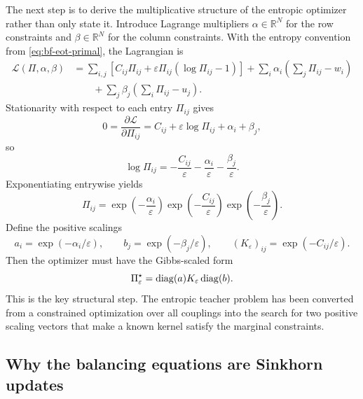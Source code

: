 The next step is to derive the multiplicative structure of the entropic optimizer
rather than only state it.  Introduce Lagrange multipliers \(\alpha\in\mathbb R^N\)
for the row constraints and \(\beta\in\mathbb R^N\) for the column constraints.
With the entropy convention from \eqref{eq:bf-eot-primal}, the Lagrangian is
\begin{align}
\label{eq:bf-eot-lagrangian}
  \mathcal L(\Pi,\alpha,\beta)
  &=
  \sum_{i,j}
  \left[
    C_{ij}\Pi_{ij}
    + \varepsilon \Pi_{ij}(\log\Pi_{ij}-1)
  \right]
  + \sum_i \alpha_i\left(\sum_j\Pi_{ij}-w_i\right) \\
  &\qquad
  + \sum_j \beta_j\left(\sum_i\Pi_{ij}-u_j\right).
\end{align}
Stationarity with respect to each entry \(\Pi_{ij}\) gives
\begin{equation}
\label{eq:bf-eot-stationarity}
  0
  =
  \frac{\partial \mathcal L}{\partial \Pi_{ij}}
  =
  C_{ij}
  + \varepsilon \log \Pi_{ij}
  + \alpha_i + \beta_j,
\end{equation}
so
\begin{equation}
\label{eq:bf-eot-log-pi}
  \log\Pi_{ij}
  =
  -\frac{C_{ij}}{\varepsilon}
  -\frac{\alpha_i}{\varepsilon}
  -\frac{\beta_j}{\varepsilon}.
\end{equation}
Exponentiating entrywise yields
\begin{equation}
\label{eq:bf-eot-entrywise-factorization}
  \Pi_{ij}
  =
  \exp\!\left(-\frac{\alpha_i}{\varepsilon}\right)
  \exp\!\left(-\frac{C_{ij}}{\varepsilon}\right)
  \exp\!\left(-\frac{\beta_j}{\varepsilon}\right).
\end{equation}
Define the positive scalings
\begin{equation}
\label{eq:bf-eot-scaling-definitions}
  a_i = \exp(-\alpha_i/\varepsilon),
  \qquad
  b_j = \exp(-\beta_j/\varepsilon),
  \qquad
  (K_\varepsilon)_{ij}=\exp(-C_{ij}/\varepsilon).
\end{equation}
Then the optimizer must have the Gibbs-scaled form
\begin{equation}
\label{eq:bf-eot-factorization}
  \Pi_\varepsilon^\star
  =
  \operatorname{diag}(a)K_\varepsilon\operatorname{diag}(b).
\end{equation}
This is the key structural step.  The entropic teacher problem has been converted
from a constrained optimization over all couplings into the search for two positive
scaling vectors that make a known kernel satisfy the marginal constraints.

\subsection{Why the balancing equations are Sinkhorn updates}
\label{sec:bf-eot-balancing-equations}

